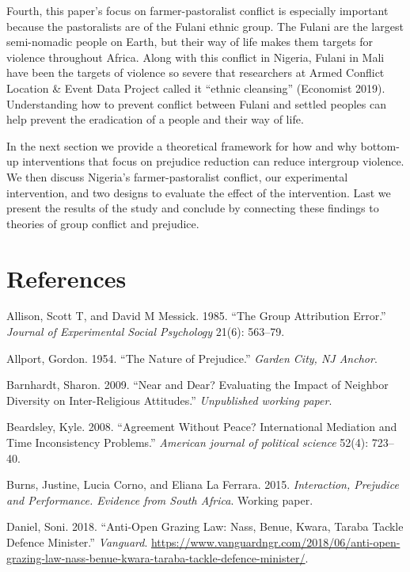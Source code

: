 \documentclass[11pt]{article}
\begin{document}
Fourth, this paper's focus on farmer-pastoralist conflict is especially
important because the pastoralists are of the Fulani ethnic group. The
Fulani are the largest semi-nomadic people on Earth, but their way of
life makes them targets for violence throughout Africa. Along with this
conflict in Nigeria, Fulani in Mali have been the targets of violence so
severe that researchers at Armed Conflict Location \& Event Data Project
called it ``ethnic cleansing'' (Economist 2019). Understanding how to
prevent conflict between Fulani and settled peoples can help prevent the
eradication of a people and their way of life.

In the next section we provide a theoretical framework for how and why
bottom-up interventions that focus on prejudice reduction can reduce
intergroup violence. We then discuss Nigeria's farmer-pastoralist
conflict, our experimental intervention, and two designs to evaluate the
effect of the intervention. Last we present the results of the study and
conclude by connecting these findings to theories of group conflict and
prejudice.

\section*{References}\label{references}

\hypertarget{refs}{}
\hypertarget{ref-allison1985group}{}
Allison, Scott T, and David M Messick. 1985. ``The Group Attribution
Error.'' \emph{Journal of Experimental Social Psychology} 21(6):
563--79.

\hypertarget{ref-allport1954prejudice}{}
Allport, Gordon. 1954. ``The Nature of Prejudice.'' \emph{Garden City,
NJ Anchor}.

\hypertarget{ref-barnhardt2009near}{}
Barnhardt, Sharon. 2009. ``Near and Dear? Evaluating the Impact of
Neighbor Diversity on Inter-Religious Attitudes.'' \emph{Unpublished
working paper}.

\hypertarget{ref-beardsley2008agreement}{}
Beardsley, Kyle. 2008. ``Agreement Without Peace? International
Mediation and Time Inconsistency Problems.'' \emph{American journal of
political science} 52(4): 723--40.

\hypertarget{ref-burns2015interaction}{}
Burns, Justine, Lucia Corno, and Eliana La Ferrara. 2015.
\emph{Interaction, Prejudice and Performance. Evidence from South
Africa}. Working paper.

\hypertarget{ref-daniel2018anti}{}
Daniel, Soni. 2018. ``Anti-Open Grazing Law: Nass, Benue, Kwara, Taraba
Tackle Defence Minister.'' \emph{Vanguard}.
\url{https://www.vanguardngr.com/2018/06/anti-open-grazing-law-nass-benue-kwara-taraba-tackle-defence-minister/}.
\end{document}
